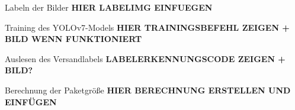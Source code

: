 \documentclass[10pt,ngerman]{beamer}
\begin{document}
\begin{frame}[fragile]{Labeln der Bilder}
  \textbf{HIER LABELIMG EINFUEGEN}
\end{frame}


\begin{frame}[fragile]{Training des YOLOv7-Models}
  \textbf{HIER TRAININGSBEFEHL ZEIGEN + BILD WENN FUNKTIONIERT}
\end{frame}


\begin{frame}[fragile]{Auslesen des Versandlabels}
  \textbf{LABELERKENNUNGSCODE ZEIGEN + BILD?}
\end{frame}


\begin{frame}[fragile]{Berechnung der Paketgröße}
  \textbf{HIER BERECHNUNG ERSTELLEN UND EINFÜGEN}
\end{frame}
\end{document}
